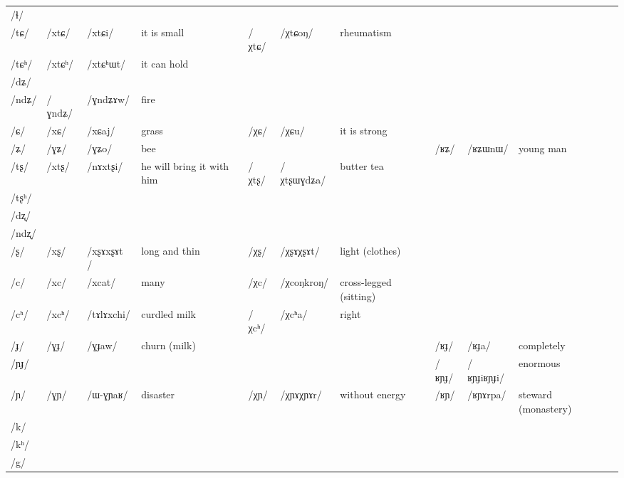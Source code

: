 \documentclass[oldfontcommands,oneside,a4paper,11pt]{article}
\newcommand{\ipa}[1]{{\phon/#1/}} %
\newcommand{\deux}[1]{/#1/}
\newcommand{\tib}[1]{\cellcolor{lightgray}\textbf{#1}}
\newcommand{\idph}[1]{\cellcolor{gray}\textbf{#1}}
\begin{document}
\begin{table}
{\begin{tabular}{l|lll|lll|lll|l}
\ipa{ɬ} 	& 	  	& 	  	& 	  	& 	  	& 	  	& 	& 	  	& 	  	& 	 \\  
\ipa{tɕ}	& 	 \deux{xtɕ}	& 	 \ipa{xtɕi}	& 	 it is small 	& 	 \deux{χtɕ}  \tib{} 	& 	 \ipa{χtɕoŋ}	& 	rheumatism	&	&	& \\  	
\ipa{tɕʰ}	& 	 \deux{xtɕʰ}	& 	 \ipa{xtɕʰɯt}	& 	it can hold	& 	  	& 	  	& 	&	&	& \\  		
\ipa{dʑ} 	& 	  	& 	  	& 	  	& 	  	& 	  	& 	& 	  	& 	  	& 	 \\  
\ipa{ndʑ}	& 	 \deux{ɣndʑ}	& 	 \ipa{ɣndʑɤw}	& 	fire	& 	  	& 	  	& 	&	&	&	 \\  	
\ipa{ɕ}	& 	 \deux{xɕ}	& 	 \ipa{xɕaj}	& 	grass	& 	 \deux{χɕ}	& 	 \ipa{χɕu}	& 	it is strong 	&	&	&\\  	
\ipa{ʑ}	& 	 \deux{ɣʑ}	& 	 \ipa{ɣʑo}	& 	bee	& 	&	&	& \ipa{ʁʑ}	&	 \ipa{ʁʑɯnɯ}	& 	young man \\  		
\ipa{tʂ}	& 	 \deux{xtʂ}	& 	 \ipa{nɤxtʂi}	& 	 he will bring it with him 	& 	 \deux{χtʂ}  \tib{}	& 	 \ipa{χtʂɯɣdʑa}	& 	butter tea 	&	&	&\\  	
\ipa{tʂʰ}	& 	  	& 	  	& 	  	& 	  	& 	  	& 	&	&	&	 \\  	
\ipa{dʐ}	& 	  	& 	  	& 	  	& 	  	& 	  	& 	&	&	&	 \\  	
\ipa{ndʐ}	& 	  	& 	  	& 	  	& 	  	& 	  	& 	&	&	&	 \\  	
\ipa{ʂ}	& 	 \deux{xʂ} \idph{}	& 	 \ipa{xʂɤxʂɤt }	& 	long and thin	& 	 \deux{χʂ} \idph{}	& 	 \ipa{χʂɤχʂɤt}	& 	light (clothes)	&	&	& \\  	
\ipa{c}	& 	 \deux{xc}	& 	 \ipa{xcat}	& 	many	& 	 \deux{χc} \tib{}	& 	 \ipa{χcoŋkroŋ}	& 	 cross-legged (sitting) 	&	&	&\\  	
\ipa{cʰ}	& 	 \deux{xcʰ}	& 	 \ipa{tɤlɤxchi}	& 	curdled milk	& 	 \deux{χcʰ}	& 	 \ipa{χcʰa}	& 	 right 	&	&	&\\  	
\ipa{ɟ}	& 	 \deux{ɣɟ}	& 	 \ipa{ɣɟaw}	& 	 churn (milk) 	& 	&	&	&	 \deux{ʁɟ}	& 	  \ipa{ʁɟa}	& 	completely  \\  	
\ipa{ɲɟ}	&  	& 	 	& 	 	& 	&	&	&	 \deux{ʁɲɟ}	& 	  \ipa{ʁɲɟiʁɲɟi}	& 	enormous  \\  	
\ipa{ɲ}	& 	 \deux{ɣɲ}	& 	 \ipa{ɯ-ɣɲaʁ}	& 	 disaster 	& 	\deux{χɲ} \idph{}	& \ipa{χɲɤχɲɤr}	& without energy 	& \deux{ʁɲ}\tib{}	& 	 \ipa{ʁɲɤrpa}	& 	steward (monastery) \\  	
\ipa{k}	& 	  	& 	  	& 	  	& 	  	& 	  	& 	& 	  	& 	  	& 	 \\  
\ipa{kʰ}	& 	  	& 	  	& 	  	& 	  	& 	  	& 	& 	  	& 	  	& 	 \\  
\ipa{g} 	& 	  	& 	  	& 	  	& 	  	& 	  	& 	& 	  	& 	  	& 	 \\  

\end{tabular}}
\end{table}
\end{document}
